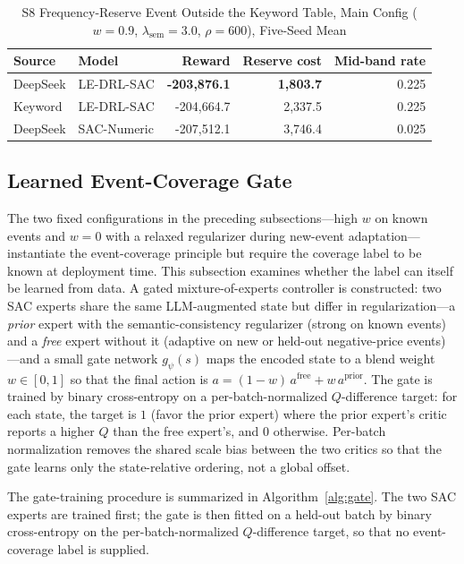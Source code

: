 \documentclass{ieeeaccess}
\begin{document}
\begin{table}[t!]
\caption{S8 Frequency-Reserve Event Outside the Keyword Table, Main Config ($w=0.9$, $\lambda_{\mathrm{sem}}=3.0$, $\rho=600$), Five-Seed Mean}
\label{tab:m5_s8}
\centering
\begin{tabular}{llrrr}
\toprule
\textbf{Source} & \textbf{Model} & \textbf{Reward} & \textbf{Reserve cost} & \textbf{Mid-band rate} \\
\midrule
DeepSeek & LE-DRL-SAC & \textbf{-203,876.1} & \textbf{1,803.7} & 0.225 \\
Keyword & LE-DRL-SAC & -204,664.7 & 2,337.5 & 0.225 \\
DeepSeek & SAC-Numeric & -207,512.1 & 3,746.4 & 0.025 \\
\bottomrule
\end{tabular}
\end{table}

\subsection{Learned Event-Coverage Gate}
\label{sec:gated_moe}
The two fixed configurations in the preceding subsections---high $w$ on known events and $w=0$ with a relaxed regularizer during new-event adaptation---instantiate the event-coverage principle but require the coverage label to be known at deployment time. This subsection examines whether the label can itself be learned from data. A gated mixture-of-experts controller is constructed: two SAC experts share the same LLM-augmented state but differ in regularization---a \emph{prior} expert with the semantic-consistency regularizer (strong on known events) and a \emph{free} expert without it (adaptive on new or held-out negative-price events)---and a small gate network $g_\psi(s)$ maps the encoded state to a blend weight $w\in[0,1]$ so that the final action is $a=(1-w)\,a^{\mathrm{free}}+w\,a^{\mathrm{prior}}$. The gate is trained by binary cross-entropy on a per-batch-normalized $Q$-difference target: for each state, the target is $1$ (favor the prior expert) where the prior expert's critic reports a higher $Q$ than the free expert's, and $0$ otherwise. Per-batch normalization removes the shared scale bias between the two critics so that the gate learns only the state-relative ordering, not a global offset.

The gate-training procedure is summarized in Algorithm~\ref{alg:gate}. The two SAC experts are trained first; the gate is then fitted on a held-out batch by binary cross-entropy on the per-batch-normalized $Q$-difference target, so that no event-coverage label is supplied.
\end{document}
